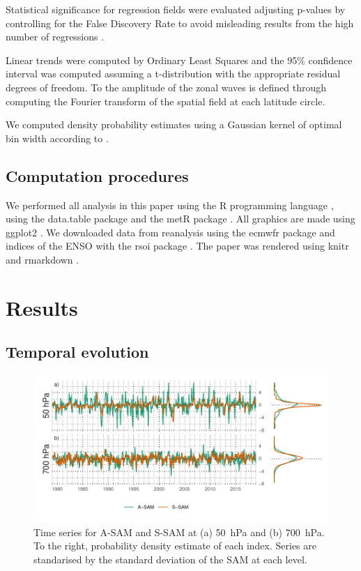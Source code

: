 \documentclass[smallextended]{svjour3}       %
\begin{document}
Statistical significance for regression fields were evaluated adjusting p-values by controlling for the False Discovery Rate \citep{benjamini1995, wilks2016} to avoid misleading results from the high number of regressions \citep{walker1914, katz1991}.

Linear trends were computed by Ordinary Least Squares and the 95\% confidence interval was computed assuming a t-distribution with the appropriate residual degrees of freedom. To the amplitude of the zonal waves is defined through computing the Fourier transform of the spatial field at each latitude circle.

We computed density probability estimates using a Gaussian kernel of optimal bin width according to \citet{sheather1991}.

\hypertarget{computation-procedures}{%
\subsection{Computation procedures}\label{computation-procedures}}

We performed all analysis in this paper using the R programming language \citep{rcoreteam2020}, using the data.table package \citep{dowle2020} and the metR package \citep{campitelli2020}. All graphics are made using ggplot2 \citep{wickham2009}. We downloaded data from reanalysis using the ecmwfr package \citep{hufkens2020} and indices of the ENSO with the rsoi package \citep{albers2020}. The paper was rendered using knitr and rmarkdown \citep{xie2015, allaire2019}.

\hypertarget{results}{%
\section{Results}\label{results}}

\hypertarget{temporal}{%
\subsection{Temporal evolution}\label{temporal}}

\begin{figure}
\includegraphics{asymsam-timeseries-1} \caption{Time series for A\nobreakdash-SAM and S\nobreakdash-SAM at (a) 50~hPa and (b) 700~hPa. To the right, probability density estimate of each index. Series are standarised by the standard deviation of the SAM at each level.}\label{fig:asymsam-timeseries}
\end{figure}
\end{document}
